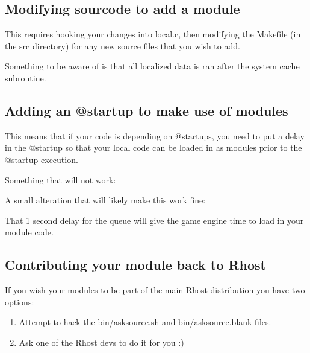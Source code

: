\documentclass[letterpaper,10pt,english]{sphinxmanual}
\begin{document}
\subsection{Modifying sourcode to add a module}
\label{\detokenize{advanced:modifying-sourcode-to-add-a-module}}
\sphinxAtStartPar
This requires hooking your changes into local.c, then modifying the Makefile (in the src directory)
for any new source files that you wish to add.

\sphinxAtStartPar
Something to be aware of is that all localized data is ran after the system cache subroutine.


\subsection{Adding an @startup to make use of modules}
\label{\detokenize{advanced:adding-an-startup-to-make-use-of-modules}}
\sphinxAtStartPar
This means that if your code is depending on @startups, you need to put a delay in the @startup
so that your local code can be loaded in as modules prior to the @startup execution.

\sphinxAtStartPar
Something that will not work:

\begin{sphinxVerbatim}[commandchars=\\\{\}]
  
\end{sphinxVerbatim}

\sphinxAtStartPar
A small alteration that will likely make this work fine:

\begin{sphinxVerbatim}[commandchars=\\\{\}]
   
\end{sphinxVerbatim}

\sphinxAtStartPar
That 1 second delay for the queue will give the game engine time to load in your module code.


\subsection{Contributing your module back to Rhost}
\label{\detokenize{advanced:contributing-your-module-back-to-rhost}}
\sphinxAtStartPar
If you wish your modules to be part of the main Rhost distribution you have two options:
\begin{enumerate}
%
\item {} 
\sphinxAtStartPar
Attempt to hack the bin/asksource.sh and bin/asksource.blank files.

\item {} 
\sphinxAtStartPar
Ask one of the Rhost devs to do it for you :)

\end{enumerate}
\end{document}
